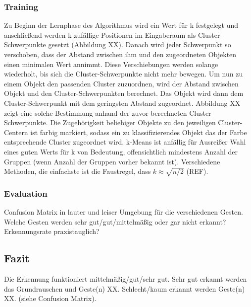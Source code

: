 \subsubsection{Training}
Zu Beginn der Lernphase des Algorithmus wird ein Wert für k festgelegt und anschließend werden k zufällige Positionen im Eingaberaum als Cluster-Schwerpunkte gesetzt (Abbildung XX). Danach wird jeder Schwerpunkt so verschoben, dass der Abstand zwischen ihm und den zugeordneten Objekten einen minimalen Wert annimmt. Diese Verschiebungen werden solange wiederholt, bis sich die Cluster-Schwerpunkte nicht mehr bewegen. 
Um nun zu einem Objekt den passenden Cluster zuzuordnen, wird der Abstand zwischen Objekt und den Cluster-Schwerpunkten berechnet. Das Objekt wird dann dem Cluster-Schwerpunkt mit dem geringsten Abstand zugeordnet. Abbildung XX zeigt eine solche Bestimmung anhand der zuvor berechneten Cluster-Schwerpunkte. Die Zugehörigkeit beliebiger Objekte zu den jeweiligen Cluster-Centern ist farbig markiert, sodass ein zu klassifizierendes Objekt das der Farbe entsprechende Cluster zugeordnet wird.
k-Means ist anfällig für Ausreißer
Wahl eines guten Werts für k von Bedeutung, offensichtlich mindestens Anzahl der Gruppen (wenn Anzahl der Gruppen vorher bekannt ist). Verschiedene Methoden, die einfachste ist die Faustregel, dass $k \approx \sqrt{n/2}$ (REF).


\subsubsection{Evaluation}
Confusion Matrix in lauter und leiser Umgebung für die verschiedenen Gesten. Welche Gesten werden sehr gut/gut/mittelmäßig oder gar nicht erkannt? Erkennungsrate praxistauglich?



\subsection{Fazit}
Die Erkennung funktioniert mittelmäßig/gut/sehr gut. Sehr gut erkannt werden das Grundrauschen und Geste(n) XX. Schlecht/kaum erkannt werden Geste(n) XX. (siehe Confusion Matrix).